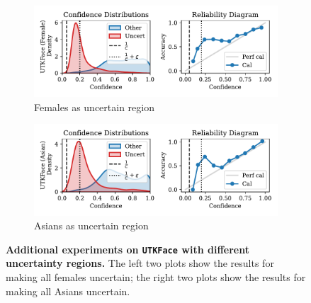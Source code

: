 \begin{figure}[t]
\centering

\begin{subfigure}[b]{0.495\textwidth}
  \centering
  \includegraphics[width=\linewidth]{figs/confidential_guardian/utkface_res_female.pdf}
  \caption{Females as uncertain region}
\end{subfigure}
\hfill
\begin{subfigure}[b]{0.495\textwidth}
  \centering
  \includegraphics[width=\linewidth]{figs/confidential_guardian/utkface_res_asian.pdf}
  \caption{Asians as uncertain region}
\end{subfigure}

\caption[\textbf{Additional experiments on \texttt{UTKFace} with different uncertainty regions.}]{\textbf{Additional experiments on \texttt{UTKFace} with different uncertainty regions.} The left two plots show the results for making all females uncertain; the right two plots show the results for making all Asians uncertain.}
\label{fig:utkface_ext}
\end{figure}


